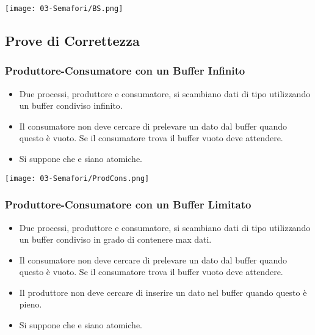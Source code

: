 
\begin{center}
   \texttt{[image: 03-Semafori/BS.png]}
\end{center}

\subsection{Prove di Correttezza}

\subsubsection{Produttore-Consumatore con un Buffer Infinito}

\begin{itemize}
  \item Due processi, produttore e consumatore, si scambiano dati di tipo  utilizzando un buffer condiviso infinito. 
  \item Il consumatore non deve cercare di prelevare un dato dal buffer quando questo è vuoto. Se il consumatore trova il buffer vuoto deve attendere. 
  \item Si suppone che  e  siano atomiche.
\end{itemize}

\begin{center}
   \texttt{[image: 03-Semafori/ProdCons.png]}
\end{center}

\subsubsection{Produttore-Consumatore con un Buffer Limitato}

\begin{itemize}
  \item Due processi, produttore e consumatore, si scambiano dati di tipo  utilizzando un buffer condiviso in grado di contenere max dati. 
  \item Il consumatore non deve cercare di prelevare un dato dal buffer quando questo è vuoto. Se il consumatore trova il buffer vuoto deve attendere. 
  \item Il produttore non deve cercare di inserire un dato nel buffer quando questo è pieno.
  \item Si suppone che  e  siano atomiche.
\end{itemize}


